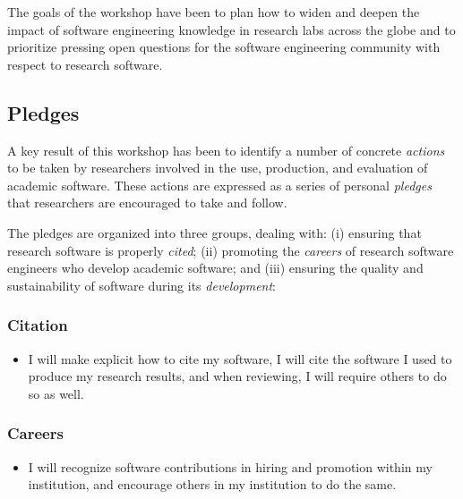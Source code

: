 \documentclass[a4paper,UKenglish]{dagman}
\renewcommand{\paragraph}[1]{\subsubsection*{#1}\xspace}
\begin{document}
The goals of the workshop have been to plan how to widen and deepen the impact of software engineering knowledge in research labs across the globe and to prioritize pressing open questions for the software engineering community with respect to research software.

\subsection{Pledges}

A key result of this workshop has been to identify a number of concrete \emph{actions} to be taken by researchers involved in the use, production, and evaluation of academic software. These actions are expressed as a series of personal \emph{pledges} that researchers are encouraged to take and follow.

The pledges are organized into three groups, dealing with:
(i) ensuring that research software is properly \emph{cited};
(ii) promoting the \emph{careers} of research software engineers who develop academic software;
and
(iii) ensuring the quality and sustainability of software during its \emph{development}:

\paragraph{Citation}
\begin{itemize}
\item I will make explicit how to cite my software, I will cite the software I used to produce my research results, and when reviewing, I will require others to do so as well.
\end{itemize}

\paragraph{Careers}
\begin{itemize}
\item I will recognize software contributions in hiring and promotion within my institution, and encourage others in my institution to do the same.
\end{itemize}

\end{document}

